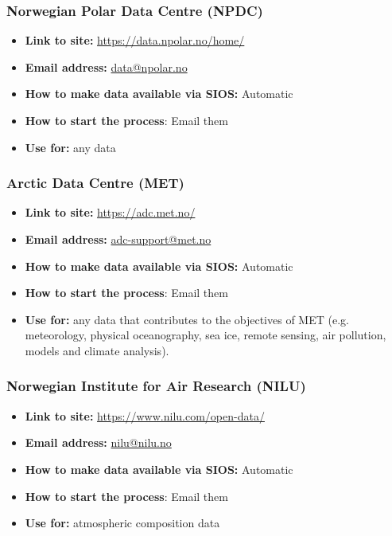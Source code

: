 \documentclass[a4paper,12pt]{article}
\begin{document}
\subsubsection{Norwegian Polar Data Centre (NPDC)}
\begin{itemize}
    \item \textbf{Link to site:} \url{https://data.npolar.no/home/}
    \item \textbf{Email address:} \href{mailto:data@npolar.no}{data@npolar.no}
    \item \textbf{How to make data available via SIOS:} Automatic
    \item \textbf{How to start the process}: Email them
    \item \textbf{Use for: } any data
\end{itemize}

\subsubsection{Arctic Data Centre (MET)}
\begin{itemize}
    \item \textbf{Link to site:} \url{https://adc.met.no/}
    \item \textbf{Email address:} \href{mailto:adc-support@met.no}{adc-support@met.no}
    \item \textbf{How to make data available via SIOS:} Automatic
    \item \textbf{How to start the process}: Email them
    \item \textbf{Use for: } any data that contributes to the objectives of MET (e.g. meteorology, physical oceanography, sea ice, remote sensing, air pollution, models and climate analysis).
\end{itemize}

\subsubsection{Norwegian Institute for Air Research (NILU)}
\begin{itemize}
    \item \textbf{Link to site:} \url{https://www.nilu.com/open-data/}
    \item \textbf{Email address:} \href{mailto:nilu@nilu.no}{nilu@nilu.no}
    \item \textbf{How to make data available via SIOS:} Automatic
    \item \textbf{How to start the process}: Email them
    \item \textbf{Use for: } atmospheric composition data
\end{itemize}
\end{document}
